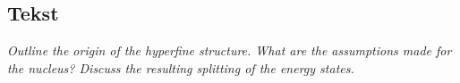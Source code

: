 \subsection{Tekst}

\emph{Outline the origin of the hyperfine structure. What are the assumptions made for the nucleus? Discuss the resulting splitting of the energy states.}